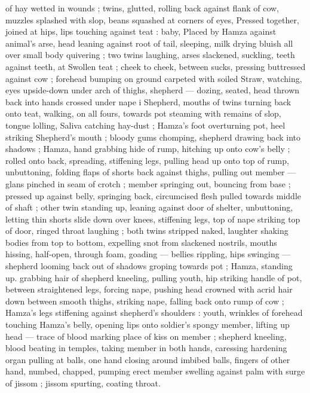 of hay wetted in wounds ; twins, glutted, rolling back against flank of 
cow, muzzles splashed with slop, beans squashed at corners of eyes, 
Pressed together, joined at hips, lips touching against teat : baby, 
Placed by Hamza against animal's arse, head leaning against root of 
tail, sleeping, milk drying bluish all over small body quivering ; two 
twins laughing, arses slackened, suckling, teeth against teeth, at 
Swollen teat ; cheek to cheek, between sucks, pressing buttressed 
against cow ; forehead bumping on ground carpeted with soiled 
Straw, watching, eyes upside-down under arch of thighs, shepherd 
--- dozing, seated, head thrown back into hands crossed under nape 
i Shepherd, mouths of twins turning back onto teat, walking, on all 
fours, towards pot steaming with remains of slop, tongue lolling, 
Saliva catching hay-dust ; Hamza's foot overturning pot, heel striking 
Shepherd's mouth ; bloody gums chomping, shepherd drawing back 
into shadows ; Hamza, hand grabbing hide of rump, hitching up onto 
cow's belly ; rolled onto back, spreading, stiffening legs, pulling 
head up onto top of rump, unbuttoning, folding flaps of shorts back 
against thighs, pulling out member --- glans pinched in seam of 
crotch ; member springing out, bouncing from base ; pressed up 
against belly, springing back, circumcised flesh pulled towards 
middle of shaft ; other twin standing up, leaning against door of 
shelter, unbuttoning, letting thin shorts slide down over knees, 
stiffening legs, top of nape striking top of door, ringed throat 
laughing ; both twins stripped naked, laughter shaking bodies from 
top to bottom, expelling snot from slackened nostrils, mouths 
hissing, half-open, through foam, goading --- bellies rippling, hips 
swinging --- shepherd looming back out of shadows groping towards 
pot ; Hamza, standing up. grabbing hair of shepherd kneeling, 
pulling youth, hip striking handle of pot, between straightened legs, 
forcing nape, pushing head crowned with acrid hair down between 
smooth thighs, striking nape, falling back onto rump of cow ; 
Hamza's legs stiffening against shepherd's shoulders : youth, 
wrinkles of forehead touching Hamza's belly, opening lips onto 
soldier's spongy member, lifting up head --- trace of blood marking 
place of kiss on member ; shepherd kneeling, blood beating in 
temples, taking member in both hands, caressing hardening organ 
pulling at balls, one hand closing around imbibed balls, fingers of 
other hand, numbed, chapped, pumping erect member swelling 
against palm with surge of jissom ; jissom spurting, coating throat. 
